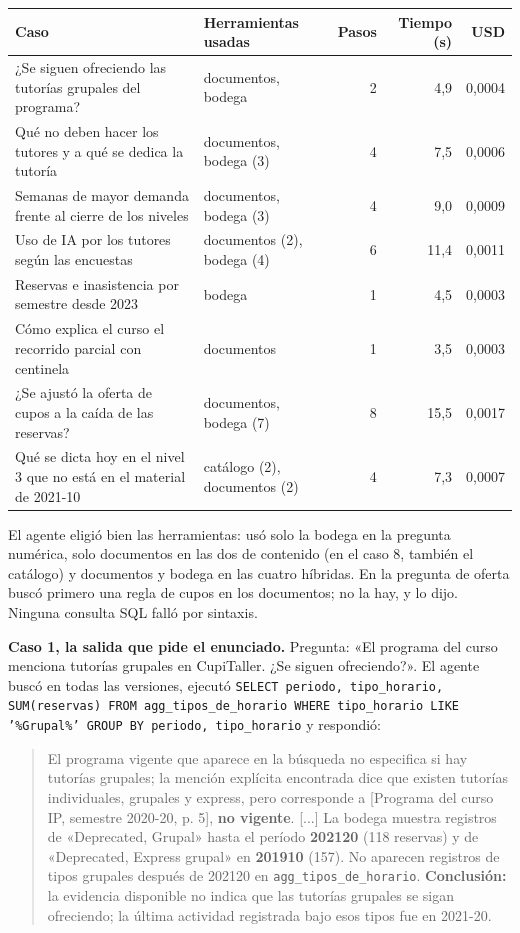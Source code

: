 \documentclass[11pt,letterpaper]{article}
\newcommand{\cod}[1]{\texttt{\small #1}}
\begin{document}
\begin{table}[H]\small\renewcommand{\arraystretch}{1.15}
\begin{tabularx}{\textwidth}{L>{\raggedright\arraybackslash}p{0.24\textwidth}RRR}
\toprule
\textbf{Caso} & \textbf{Herramientas usadas} & \textbf{Pasos} & \textbf{Tiempo (s)} & \textbf{USD} \\
\midrule
¿Se siguen ofreciendo las tutorías grupales del programa? & documentos, bodega & 2 & 4,9 & 0,0004 \\
Qué no deben hacer los tutores y a qué se dedica la tutoría & documentos, bodega (3) & 4 & 7,5 & 0,0006 \\
Semanas de mayor demanda frente al cierre de los niveles & documentos, bodega (3) & 4 & 9,0 & 0,0009 \\
Uso de IA por los tutores según las encuestas & documentos (2), bodega (4) & 6 & 11,4 & 0,0011 \\
Reservas e inasistencia por semestre desde 2023 & bodega & 1 & 4,5 & 0,0003 \\
Cómo explica el curso el recorrido parcial con centinela & documentos & 1 & 3,5 & 0,0003 \\
¿Se ajustó la oferta de cupos a la caída de las reservas? & documentos, bodega (7) & 8 & 15,5 & 0,0017 \\
Qué se dicta hoy en el nivel 3 que no está en el material de 2021-10 & catálogo (2), documentos (2) & 4 & 7,3 & 0,0007 \\
\bottomrule
\end{tabularx}
\end{table}

El agente eligió bien las herramientas: usó solo la bodega en la pregunta numérica, solo documentos en las dos de contenido (en el caso 8, también el catálogo) y documentos y bodega en las cuatro híbridas. En la pregunta de oferta buscó primero una regla de cupos en los documentos; no la hay, y lo dijo. Ninguna consulta SQL falló por sintaxis.

\textbf{Caso 1, la salida que pide el enunciado.} Pregunta: «El programa del curso menciona tutorías grupales en CupiTaller. ¿Se siguen ofreciendo?». El agente buscó en todas las versiones, ejecutó \cod{SELECT periodo, tipo\_horario, SUM(reservas) FROM agg\_tipos\_de\_horario WHERE tipo\_horario LIKE '\%Grupal\%' GROUP BY periodo, tipo\_horario} y respondió:

\begin{quote}\small
El programa vigente que aparece en la búsqueda no especifica si hay tutorías grupales; la mención explícita encontrada dice que existen tutorías individuales, grupales y express, pero corresponde a [Programa del curso IP, semestre 2020-20, p. 5], \textbf{no vigente}. [...] La bodega muestra registros de «Deprecated, Grupal» hasta el período \textbf{202120} (118 reservas) y de «Deprecated, Express grupal» en \textbf{201910} (157). No aparecen registros de tipos grupales después de 202120 en \cod{agg\_tipos\_de\_horario}. \textbf{Conclusión:} la evidencia disponible no indica que las tutorías grupales se sigan ofreciendo; la última actividad registrada bajo esos tipos fue en 2021-20.
\end{quote}
\end{document}

